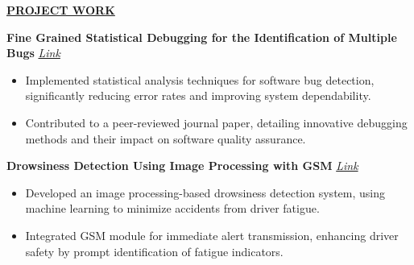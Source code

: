 \documentclass{article}
\begin{document}
\noindent \textbf{\underline{PROJECT WORK}} 

\noindent \textbf{Fine Grained Statistical Debugging for the Identification of Multiple Bugs}
\textit{\href{https://www.ijert.org/fine-grained-statistical-debugging-for-the-identification-of-multiple-bugs}{Link}}
\begin{itemize}[noitemsep,nolistsep,leftmargin=*]
\item {\small Implemented statistical analysis techniques for software bug detection, significantly reducing error rates and improving system dependability.}
\item {\small Contributed to a peer-reviewed journal paper, detailing innovative debugging methods and their impact on software quality assurance.}
\end{itemize}
\vspace{1mm} 
\noindent \textbf{Drowsiness Detection Using Image Processing with GSM}
\textit{\href{https://www.irjet.net/archives/V8/i5/IRJET-V8I5773.pdf}{Link}}
\begin{itemize}[noitemsep,nolistsep,leftmargin=*]
\item {\small Developed an image processing-based drowsiness detection system, using machine learning to minimize accidents from driver fatigue.}
\item {\small Integrated GSM module for immediate alert transmission, enhancing driver safety by prompt identification of fatigue indicators.}\\
\end{itemize}


\end{document}
